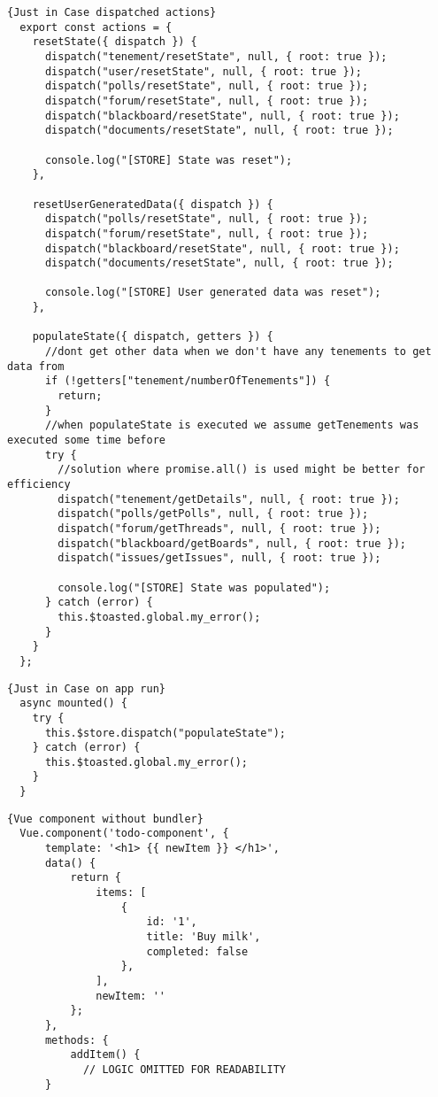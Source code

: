 \begin{lstlisting}[caption=Just in Case dispatched actions, captionpos=b, style=htmlcssjs, label=jicdispa]{Just in Case dispatched actions}
  export const actions = {
    resetState({ dispatch }) {
      dispatch("tenement/resetState", null, { root: true });
      dispatch("user/resetState", null, { root: true });
      dispatch("polls/resetState", null, { root: true });
      dispatch("forum/resetState", null, { root: true });
      dispatch("blackboard/resetState", null, { root: true });
      dispatch("documents/resetState", null, { root: true });
  
      console.log("[STORE] State was reset");
    },
  
    resetUserGeneratedData({ dispatch }) {
      dispatch("polls/resetState", null, { root: true });
      dispatch("forum/resetState", null, { root: true });
      dispatch("blackboard/resetState", null, { root: true });
      dispatch("documents/resetState", null, { root: true });
  
      console.log("[STORE] User generated data was reset");
    },
  
    populateState({ dispatch, getters }) {
      //dont get other data when we don't have any tenements to get data from
      if (!getters["tenement/numberOfTenements"]) {
        return;
      }
      //when populateState is executed we assume getTenements was executed some time before
      try {
        //solution where promise.all() is used might be better for efficiency
        dispatch("tenement/getDetails", null, { root: true });
        dispatch("polls/getPolls", null, { root: true });
        dispatch("forum/getThreads", null, { root: true });
        dispatch("blackboard/getBoards", null, { root: true });
        dispatch("issues/getIssues", null, { root: true });
  
        console.log("[STORE] State was populated");
      } catch (error) {
        this.$toasted.global.my_error();
      }
    }
  };
\end{lstlisting}

\begin{lstlisting}[caption=Just in Case Store Population on app run, captionpos=b, style=htmlcssjs, label=jic]{Just in Case on app run}
  async mounted() {
    try {
      this.$store.dispatch("populateState");
    } catch (error) {
      this.$toasted.global.my_error();
    }
  }
\end{lstlisting}

\newpage

\begin{lstlisting}[caption=Vue component without bundler, captionpos=b, style=htmlcssjs, label=compwobundler]{Vue component without bundler}
  Vue.component('todo-component', {
      template: '<h1> {{ newItem }} </h1>',
      data() {
          return {
              items: [
                  {
                      id: '1',
                      title: 'Buy milk',
                      completed: false
                  },
              ],
              newItem: ''
          };
      },
      methods: {
          addItem() {
            // LOGIC OMITTED FOR READABILITY
      }
  \end{lstlisting}